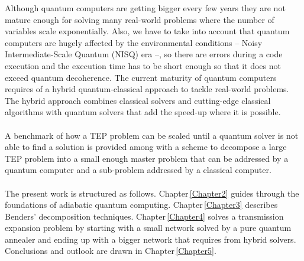 %
%
Although quantum computers are getting bigger every few years they are not mature enough for solving many real-world problems where the number of variables scale exponentially. Also, we have to take into account that quantum computers are hugely affected by the environmental conditions -- Noisy Intermediate-Scale Quantum (NISQ) era --, so there are errors during a code execution and the execution time has to be short enough so that it does not exceed quantum decoherence. The current maturity of quantum computers requires of a hybrid quantum-classical approach to tackle real-world problems. The hybrid approach combines classical solvers and cutting-edge classical algorithms with quantum solvers that add the speed-up where it is possible.\\\\
A benchmark of how a TEP problem can be scaled until a quantum solver is not able to find a solution is provided among with a scheme to decompose a large TEP problem into a small enough master problem that can be addressed by a quantum computer and a sub-problem addressed by a classical computer. \\\\
%
The present work is structured as follows. Chapter\,\ref{Chapter2} guides through the foundations of adiabatic quantum computing. Chapter\,\ref{Chapter3} describes Benders' decomposition techniques. Chapter\,\ref{Chapter4} solves a transmission expansion problem by starting with a small network solved by a pure quantum annealer and ending up with a bigger network that requires from hybrid solvers. Conclusions and outlook are drawn in Chapter\,\ref{Chapter5}.
